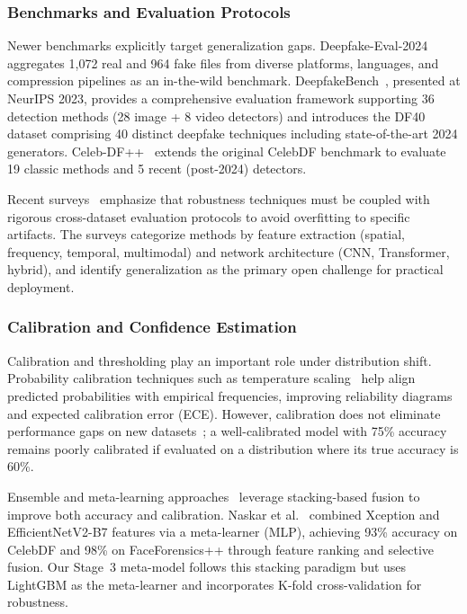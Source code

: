 \subsubsection*{Benchmarks and Evaluation Protocols}
Newer benchmarks explicitly target generalization gaps. Deepfake\hyp Eval\hyp 2024~\cite{deepeval2024} aggregates 1,072 real and 964 fake files from diverse platforms, languages, and compression pipelines as an in\hyp the\hyp wild benchmark. DeepfakeBench~\cite{zhang2024deepfakebench}, presented at NeurIPS 2023, provides a comprehensive evaluation framework supporting 36 detection methods (28 image + 8 video detectors) and introduces the DF40 dataset comprising 40 distinct deepfake techniques including state\hyp of\hyp the\hyp art 2024 generators. Celeb\hyp DF++~\cite{li2025celebdfpp} extends the original CelebDF benchmark to evaluate 19 classic methods and 5 recent (post\hyp 2024) detectors.

Recent surveys~\cite{pei2024deepfakesurvey,electronics2024survey,springer2025multimodal} emphasize that robustness techniques must be coupled with rigorous cross\hyp dataset evaluation protocols to avoid overfitting to specific artifacts. The surveys categorize methods by feature extraction (spatial, frequency, temporal, multimodal) and network architecture (CNN, Transformer, hybrid), and identify generalization as the primary open challenge for practical deployment.

\subsubsection*{Calibration and Confidence Estimation}
Calibration and thresholding play an important role under distribution shift. Probability calibration techniques such as temperature scaling~\cite{guo2017calibration,minderer2021revisiting} help align predicted probabilities with empirical frequencies, improving reliability diagrams and expected calibration error (ECE). However, calibration does not eliminate performance gaps on new datasets~\cite{pei2024deepfakesurvey}; a well\hyp calibrated model with 75\% accuracy remains poorly calibrated if evaluated on a distribution where its true accuracy is 60\%.

Ensemble and meta\hyp learning approaches~\cite{naskar2024ensemble,zhou2024deepfakestack} leverage stacking\hyp based fusion to improve both accuracy and calibration. Naskar et al.~\cite{naskar2024ensemble} combined Xception and EfficientNetV2-B7 features via a meta\hyp learner (MLP), achieving 93\% accuracy on CelebDF and 98\% on FaceForensics++ through feature ranking and selective fusion. Our Stage~3 meta\hyp model follows this stacking paradigm but uses LightGBM as the meta\hyp learner and incorporates K\hyp fold cross\hyp validation for robustness.


